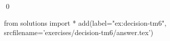 
\begin{ex} 
  \label{ex:decision-tm6}
  
  \qed
\end{ex} 
\begin{python0}
from solutions import *
add(label="ex:decision-tm6",
    srcfilename='exercises/decision-tm6/answer.tex') 
\end{python0}
